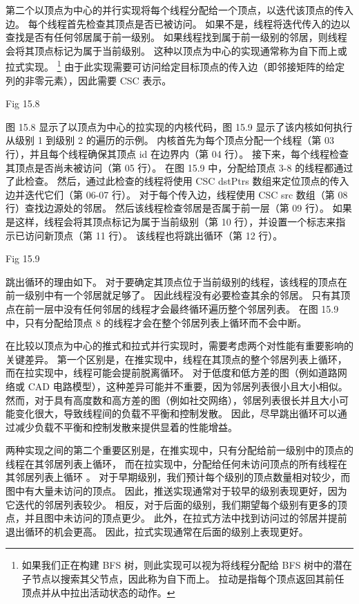 第二个以顶点为中心的并行实现将每个线程分配给一个顶点，以迭代该顶点的传入边。 每个线程首先检查其顶点是否已被访问。 
如果不是，线程将迭代传入的边以查找是否有任何邻居属于前一级别。 
如果线程找到属于前一级别的邻居，则线程会将其顶点标记为属于当前级别。 
这种以顶点为中心的实现通常称为自下而上或拉式实现。 
\footnote{如果我们正在构建 BFS 树，则此实现可以视为将线程分配给 BFS 树中的潜在子节点以搜索其父节点，因此称为自下而上。 
拉动是指每个顶点返回其前任顶点并从中拉出活动状态的动作。}
由于此实现需要可访问给定目标顶点的传入边（即邻接矩阵的给定列的非零元素），因此需要 CSC 表示。

{\color{red} Fig 15.8}

图 15.8 显示了以顶点为中心的拉实现的内核代码，图 15.9 显示了该内核如何执行从级别 1 到级别 2 的遍历的示例。 
内核首先为每个顶点分配一个线程（第 03 行），并且每个线程确保其顶点 id 在边界内（第 04 行）。 
接下来，每个线程检查其顶点是否尚未被访问（第 05 行）。 在图 15.9 中，分配给顶点 3-8 的线程都通过了此检查。 
然后，通过此检查的线程将使用 CSC dstPtrs 数组来定位顶点的传入边并迭代它们（第 06-07 行）。 
对于每个传入边，线程使用 CSC src 数组（第 08 行）查找边源处的邻居。 然后该线程检查邻居是否属于前一层（第 09 行）。 
如果是这样，线程会将其顶点标记为属于当前级别（第 10 行），并设置一个标志来指示已访问新顶点（第 11 行）。 
该线程也将跳出循环（第 12 行）。

{\color{red} Fig 15.9}

跳出循环的理由如下。 对于要确定其顶点位于当前级别的线程，该线程的顶点在前一级别中有一个邻居就足够了。 
因此线程没有必要检查其余的邻居。 只有其顶点在前一层中没有任何邻居的线程才会最终循环遍历整个邻居列表。 
在图 15.9 中，只有分配给顶点 8 的线程才会在整个邻居列表上循环而不会中断。

在比较以顶点为中心的推式和拉式并行实现时，需要考虑两个对性能有重要影响的关键差异。 
第一个区别是，在推实现中，线程在其顶点的整个邻居列表上循环，而在拉实现中，线程可能会提前脱离循环。 
对于低度和低方差的图（例如道路网络或 CAD 电路模型），这种差异可能并不重要，因为邻居列表很小且大小相似。 
然而，对于具有高度数和高方差的图（例如社交网络），邻居列表很长并且大小可能变化很大，导致线程间的负载不平衡和控制发散。 
因此，尽早跳出循环可以通过减少负载不平衡和控制发散来提供显着的性能增益。

两种实现之间的第二个重要区别是，在推实现中，只有分配给前一级别中的顶点的线程在其邻居列表上循环，
而在拉实现中，分配给任何未访问顶点的所有线程在其邻居列表上循环 。 
对于早期级别，我们预计每个级别的顶点数量相对较少，而图中有大量未访问的顶点。 
因此，推送实现通常对于较早的级别表现更好，因为它迭代的邻居列表较少。 
相反，对于后面的级别，我们期望每个级别有更多的顶点，并且图中未访问的顶点更少。 
此外，在拉式方法中找到访问过的邻居并提前退出循环的机会更高。 因此，拉式实现通常在后面的级别上表现更好。

